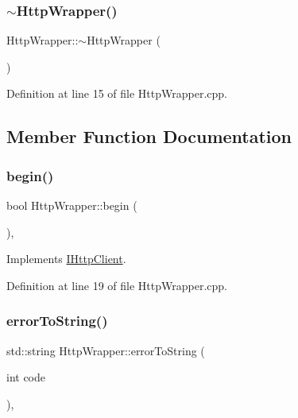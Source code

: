 \subsubsection{\texorpdfstring{$\sim$\+Http\+Wrapper()}{~HttpWrapper()}}
{\footnotesize\ttfamily Http\+Wrapper\+::$\sim$\+Http\+Wrapper (\begin{DoxyParamCaption}{ }\end{DoxyParamCaption})}



Definition at line 15 of file Http\+Wrapper.\+cpp.



\subsection{Member Function Documentation}
\mbox{\label{class_http_wrapper_ad93bf7eb4c3d84f3b49a8b9673c207f6}} 
\subsubsection{\texorpdfstring{begin()}{begin()}}
{\footnotesize\ttfamily bool Http\+Wrapper\+::begin (\begin{DoxyParamCaption}{ }\end{DoxyParamCaption})\hspace{0.3cm}{\ttfamily [override]}, {\ttfamily [virtual]}}



Implements \hyperlink{class_i_http_client_a8975ccaf71b99eef3f85f86a56878d93}{I\+Http\+Client}.



Definition at line 19 of file Http\+Wrapper.\+cpp.

\mbox{\label{class_http_wrapper_a9d75ef86fdb6e26d6835a774442eeb9f}} 
\subsubsection{\texorpdfstring{error\+To\+String()}{errorToString()}}
{\footnotesize\ttfamily std\+::string Http\+Wrapper\+::error\+To\+String (\begin{DoxyParamCaption}\item[{int}]{code }\end{DoxyParamCaption})\hspace{0.3cm}{\ttfamily [override]}, {\ttfamily [virtual]}}



